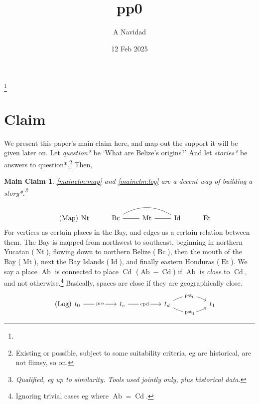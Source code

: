 \documentclass{amsart}
\newcommand{\mention}[1]{\textit{#1}}%
\DeclareMathOperator{\ab}{Ab}%
\DeclareMathOperator{\cd}{Cd}%
\DeclareMathOperator{\id}{Id}%
\DeclareMathOperator{\mt}{Mt}%
\DeclareMathOperator{\bc}{Bc}%
\DeclareMathOperator{\et}{Et}%
\DeclareMathOperator{\nt}{Nt}%
\DeclareMathOperator{\pre}{pre}%
\DeclareMathOperator{\pst}{pst}%
\DeclareMathOperator{\cpd}{cpd}%
\newtheorem{mainclm}{Main Claim}%
\theoremstyle{definition}
\theoremstyle{remark}
\begin{document}
%
%
\label{start}
\title{pp0}
\author{A Navidad}
\address{Harvard College, Cambridge MA}
\date{12 Feb 2025}
\thanks{}%
\begin{abstract}
\end{abstract}
\keywords{}
\maketitle
%
%
%
\section{Claim}
	\label{s:claim}
	We present this paper's main claim here, and map out the support it will be given later on. Let \mention{question*} be `What are Belize's origins?' And let \mention{stories*} be answers to question*.\footnote{Existing or possible, subject to some suitability criteria, eg are historical, are not flimsy, so on.} Then,
	\begin{mainclm}
	\label{mainclm:1}
	\ref{mainclm:map} and \ref{mainclm:log} are a decent way of building a story*.\footnote{Qualified, eg up to similarity. Tools used jointly only, plus historical data.}
	\end{mainclm}
	\begin{equation}
	\tag{Map}
	\label{mainclm:map}
		\begin{tikzcd}[arrows=dash]
		\nt &\bc \rar \ar[rr,bend left] &\mt \rar &\id &\et
		\end{tikzcd}
	\end{equation}
	For vertices as certain places in the Bay, and edges as a certain relation between them. The Bay is mapped from northwest to southeast, beginning in northern Yucatan (\(\nt\)), flowing down to northern Belize (\(\bc\)), then the mouth of the Bay (\(\mt\)), next the Bay Islands (\(\id\)), and finally eastern Honduras (\(\et\)). We say a place \(\ab\) is connected to place \(\cd\) (\(\ab-\cd\)) if \(\ab\) is \mention{close} to \(\cd\), and not otherwise.\footnote{Ignoring trivial cases eg where \(\ab=\cd\).} Basically, spaces are close if they are geographically close.
	\begin{equation}
	\tag{Log}
	\label{mainclm:log}
		\begin{tikzcd}[sep=huge]
		t_0 \rar["\pre" description] &t_c \rar["\cpd" description] &t_d \rar[bend left,"\pst_0" description] \rar[bend right,"\pst_1" description] &t_1
		\end{tikzcd}
	\end{equation}
\end{document}
